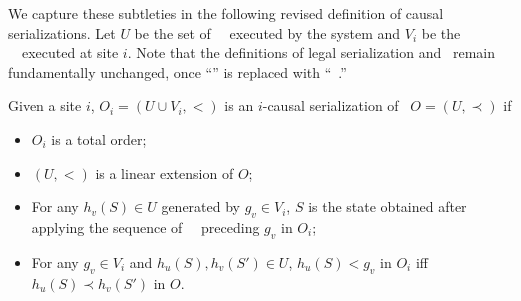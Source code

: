 We capture these subtleties in the following revised
  definition of causal serializations.  Let $U$ be the set of
\shadow\ \operations\ executed by the system and $V_i$ be the
\initial\ \operations\ executed at site $i$.
Note that the definitions of legal serialization and
  \RBo\ remain fundamentally unchanged, once ``\operation'' is
  replaced with ``\shadow\ \operation.''
\begin{mydef}
Given a site $i$, $O_i=(U\cup V_i, <)$ is an $i$-causal serialization
of \RBo\ $O=(U,\prec)$ if
\begin{itemize}
\item $O_i$ is a total order;
\item $(U,<)$ is a linear extension of $O$;
\item For any $h_v(S)\in U$ generated by $g_v\in V_i$, $S$ is the
  state obtained after applying the sequence of
  \shadow\ \operations\ preceding $g_v$ in $O_i$;
\item For any $g_v\in V_i$ and $h_u(S), h_v(S') \in U$, $h_u(S)<g_v$ in $O_i$
  iff $h_u(S) \prec h_v(S')$ in $O$.
\end{itemize}
\label{def:shadowcausal}
\end{mydef}


